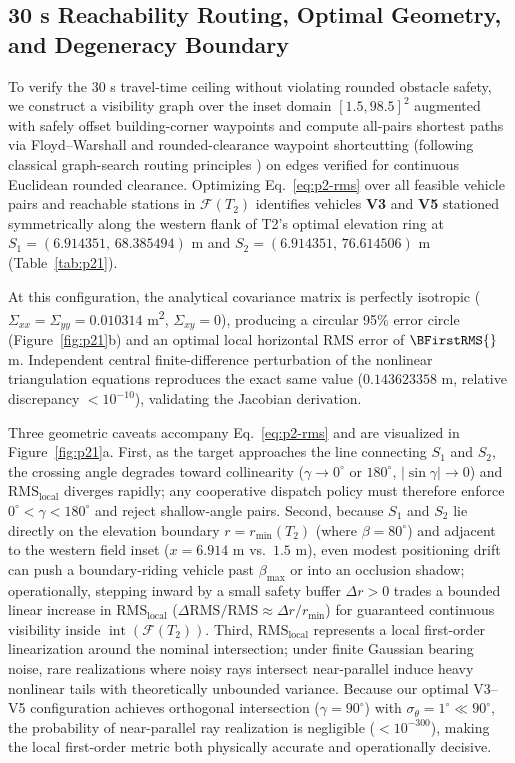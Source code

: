 \subsection{30 s Reachability Routing, Optimal Geometry, and Degeneracy Boundary}
To verify the 30 s travel-time ceiling without violating rounded obstacle safety, we construct a visibility graph over the inset domain $[1.5,98.5]^2$ augmented with safely offset building-corner waypoints and compute all-pairs shortest paths via Floyd--Warshall and rounded-clearance waypoint shortcutting (following classical graph-search routing principles \cite{dijkstra1959,hart1968}) on edges verified for continuous Euclidean rounded clearance. Optimizing Eq.~\eqref{eq:p2-rms} over all feasible vehicle pairs and reachable stations in $\mathcal{F}(T_2)$ identifies vehicles \textbf{V3} and \textbf{V5} stationed symmetrically along the western flank of T2's optimal elevation ring at $S_1=(6.914351,\,68.385494)$ m and $S_2=(6.914351,\,76.614506)$ m (Table~\ref{tab:p21}).

At this configuration, the analytical covariance matrix is perfectly isotropic ($\Sigma_{xx}=\Sigma_{yy}=0.010314$ m\textsuperscript{2}, $\Sigma_{xy}=0$), producing a circular 95\% error circle (Figure~\ref{fig:p21}b) and an optimal local horizontal RMS error of $\BFirstRMS{}$ m. Independent central finite-difference perturbation of the nonlinear triangulation equations reproduces the exact same value ($0.143623358$ m, relative discrepancy $<10^{-10}$), validating the Jacobian derivation.

Three geometric caveats accompany Eq.~\eqref{eq:p2-rms} and are visualized in Figure~\ref{fig:p21}a. First, as the target approaches the line connecting $S_1$ and $S_2$, the crossing angle degrades toward collinearity ($\gamma\to 0^\circ$ or $180^\circ$, $|\sin\gamma|\to 0$) and $\mathrm{RMS}_{\mathrm{local}}$ diverges rapidly; any cooperative dispatch policy must therefore enforce $0^\circ<\gamma<180^\circ$ and reject shallow-angle pairs. Second, because $S_1$ and $S_2$ lie directly on the elevation boundary $r=r_{\min}(T_2)$ (where $\beta=80^\circ$) and adjacent to the western field inset ($x=6.914$ m vs.\ $1.5$ m), even modest positioning drift can push a boundary-riding vehicle past $\beta_{\max}$ or into an occlusion shadow; operationally, stepping inward by a small safety buffer $\Delta r>0$ trades a bounded linear increase in $\mathrm{RMS}_{\mathrm{local}}$ ($\Delta\mathrm{RMS}/\mathrm{RMS}\approx\Delta r/r_{\min}$) for guaranteed continuous visibility inside $\operatorname{int}(\mathcal{F}(T_2))$. Third, $\mathrm{RMS}_{\mathrm{local}}$ represents a local first-order linearization around the nominal intersection; under finite Gaussian bearing noise, rare realizations where noisy rays intersect near-parallel induce heavy nonlinear tails with theoretically unbounded variance. Because our optimal V3--V5 configuration achieves orthogonal intersection ($\gamma=90^\circ$) with $\sigma_\theta=1^\circ\ll 90^\circ$, the probability of near-parallel ray realization is negligible ($<10^{-300}$), making the local first-order metric both physically accurate and operationally decisive.
